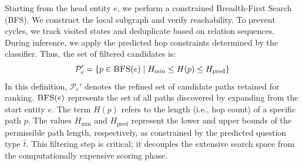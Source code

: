 Starting from the head entity $e$, we perform a constrained Breadth-First Search (BFS). We construct the local subgraph and verify reachability. To prevent cycles, we track visited states and deduplicate based on relation sequences. During inference, we apply the predicted hop constraints determined by the classifier. Thus, the set of filtered candidates is:
\begin{equation}
    \mathcal{P}_{e}' = \{ p \in \textsc{BFS}(e) \mid H_{\min} \le H(p) \le H_{\text{pred}} \}
    \label{eq:PePrime}
\end{equation}
In this definition, $\mathcal{P}_{e}'$ denotes the refined set of candidate paths retained for ranking. $\textsc{BFS}(e)$ represents the set of all paths discovered by expanding from the start entity $e$. The term $H(p)$ refers to the length (i.e., hop count) of a specific path $p$. The values $H_{\min}$ and $H_{\text{pred}}$ represent the lower and upper bounds of the permissible path length, respectively, as constrained by the predicted question type $\hat{t}$. This filtering step is critical; it decouples the extensive search space from the computationally expensive scoring phase.
